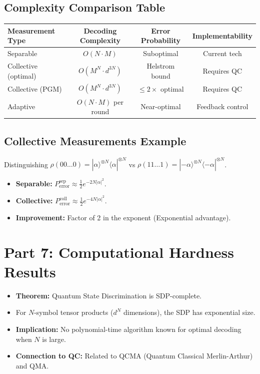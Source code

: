 \documentclass[11pt,a4paper]{article}
\begin{document}
\subsection{Complexity Comparison Table}

\begin{center}
\begin{tabular}{|l|c|c|c|}
\hline
\textbf{Measurement Type} & \textbf{Decoding Complexity} & \textbf{Error Probability} & \textbf{Implementability} \\
\hline
Separable & $O(N \cdot M)$ & Suboptimal & Current tech \\
\hline
Collective (optimal) & $O(M^N \cdot d^{3N})$ & Helstrom bound & Requires QC \\
\hline
Collective (PGM) & $O(M^N \cdot d^{3N})$ & $\leq 2\times$ optimal & Requires QC \\
\hline
Adaptive & $O(N \cdot M)$ per round & Near-optimal & Feedback control \\
\hline
\end{tabular}
\end{center}

\subsection{Collective Measurements Example}

Distinguishing $\rho(00\ldots0) = |\alpha\rangle^{\otimes N}\langle\alpha|^{\otimes N}$ vs $\rho(11\ldots1) = |-\alpha\rangle^{\otimes N}\langle-\alpha|^{\otimes N}$.

\begin{itemize}
    \item \textbf{Separable:} $P_{\text{error}}^{\text{sep}} \approx \frac{1}{2}e^{-2N|\alpha|^2}$.
    \item \textbf{Collective:} $P_{\text{error}}^{\text{coll}} \approx \frac{1}{2}e^{-4N|\alpha|^2}$.
    \item \textbf{Improvement:} Factor of 2 in the exponent (Exponential advantage).
\end{itemize}

\section{Part 7: Computational Hardness Results}

\begin{itemize}
    \item \textbf{Theorem:} Quantum State Discrimination is SDP-complete.
    \item For $N$-symbol tensor products ($d^N$ dimensions), the SDP has exponential size.
    \item \textbf{Implication:} No polynomial-time algorithm known for optimal decoding when $N$ is large.
    \item \textbf{Connection to QC:} Related to QCMA (Quantum Classical Merlin-Arthur) and QMA.
\end{itemize}
\end{document}
